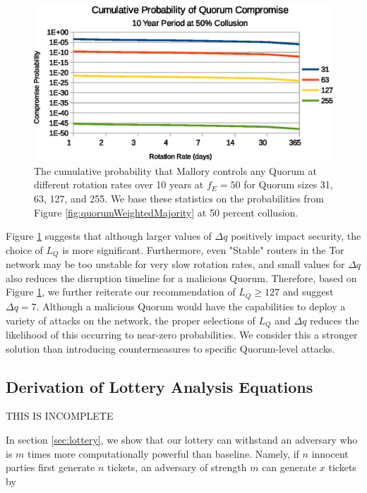 \documentclass[USenglish,oneside,twocolumn]{article}
\begin{document}
\begin{figure}[h]
	\centering
	\includegraphics[width=\linewidth]{../assets/analysis/CumulativeMaliciousQuorumNew.eps}
	\caption{The cumulative probability that Mallory controls any Quorum at different rotation rates over 10 years at $ f_{E} = 50 $ for Quorum sizes 31, 63, 127, and 255. We base these statistics on the probabilities from Figure \ref{fig:quorumWeightedMajority} at 50 percent collusion.}
	\label{fig:cumulativeProbability}
\end{figure}

Figure \ref{fig:cumulativeProbability} suggests that although larger values of $ \Delta q $ positively impact security, the choice of $ L_{Q} $ is more significant. Furthermore, even "Stable" routers in the Tor network may be too unstable for very slow rotation rates, and small values for $ \Delta q $ also reduces the disruption timeline for a malicious Quorum. Therefore, based on Figure \ref{fig:cumulativeProbability}, we further reiterate our recommendation of $ L_{Q} \geq 127 $ and suggest $ \Delta q = 7 $. Although a malicious Quorum would have the capabilities to deploy a variety of attacks on the network, the proper selections of $ L_{Q} $ and $ \Delta q $ reduces the likelihood of this occurring to near-zero probabilities. We consider this a stronger solution than introducing countermeasures to specific Quorum-level attacks.

\subsection{Derivation of Lottery Analysis Equations} %

THIS IS INCOMPLETE

In section \ref{sec:lottery}, we show that our lottery can withstand an adversary who is $ m $ times more computationally powerful than baseline. Namely, if $ n $ innocent parties first generate $ n $ tickets, an adversary of strength $ m $ can generate $ x $ tickets by
\end{document}
